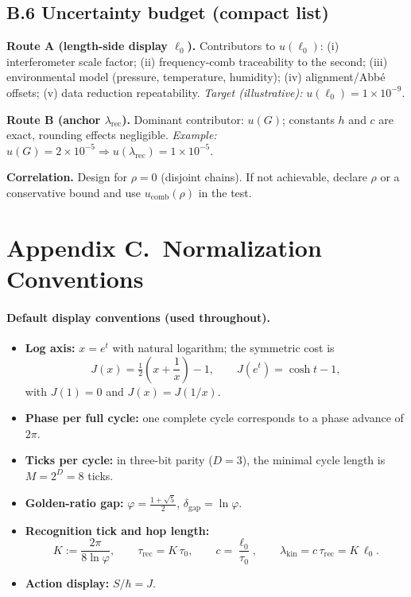 \documentclass[11pt]{article}
\theoremstyle{plain}
\theoremstyle{definition}
\theoremstyle{remark}
\begin{document}
\subsection*{B.6 Uncertainty budget (compact list)}
\textbf{Route A (length-side display \(\ell_0\)).} Contributors to \(u(\ell_0)\): (i) interferometer scale factor; (ii) frequency-comb traceability to the second; (iii) environmental model (pressure, temperature, humidity); (iv) alignment/Abbé offsets; (v) data reduction repeatability. \emph{Target (illustrative):} \(u(\ell_0)=1\times10^{-9}\).

\textbf{Route B (anchor \(\lambda_{\mathrm{rec}}\)).} Dominant contributor: \(u(G)\); constants \(h\) and \(c\) are exact, rounding effects negligible. \emph{Example:} \(u(G)=2\times10^{-5}\Rightarrow u(\lambda_{\mathrm{rec}})=1\times10^{-5}\).

\textbf{Correlation.} Design for \(\rho=0\) (disjoint chains). If not achievable, declare \(\rho\) or a conservative bound and use \(u_{\mathrm{comb}}(\rho)\) in the test.

\section*{Appendix C.\ Normalization Conventions}

\paragraph{Default display conventions (used throughout).}
\begin{itemize}
  \item \textbf{Log axis:} \(x=e^{t}\) with natural logarithm; the symmetric cost is
  \[
  J(x)=\tfrac12\!\left(x+\frac{1}{x}\right)-1,\qquad J(e^{t})=\cosh t-1,
  \]
  with \(J(1)=0\) and \(J(x)=J(1/x)\).
  \item \textbf{Phase per full cycle:} one complete cycle corresponds to a phase advance of \(2\pi\).
  \item \textbf{Ticks per cycle:} in three-bit parity (\(D=3\)), the minimal cycle length is \(M=2^{D}=8\) ticks.
  \item \textbf{Golden-ratio gap:} \(\varphi=\tfrac{1+\sqrt5}{2}\), \(\delta_{\mathrm{gap}}=\ln\varphi\).
  \item \textbf{Recognition tick and hop length:}
  \[
  K:=\frac{2\pi}{8\ln\varphi},\qquad
  \tau_{\mathrm{rec}}=K\,\tau_{0},\qquad
  c=\frac{\ell_{0}}{\tau_{0}},\qquad
  \lambda_{\mathrm{kin}}=c\,\tau_{\mathrm{rec}}=K\,\ell_{0}.
  \]
  \item \textbf{Action display:} \(S/\hbar=J\).
\end{itemize}
\end{document}
